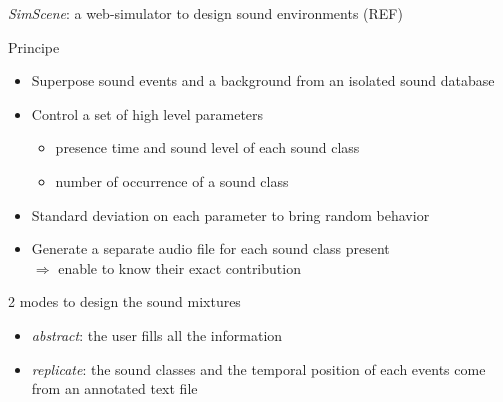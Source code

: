 \documentclass{beamer}
\begin{document}
\begin{frame}{\textit{SimScene}: a web-simulator to design sound environments (REF)}
\begin{block}{Principe}
\begin{itemize}
	\item Superpose sound events and a background from an isolated sound database
	\item Control a set of high level parameters
	\begin{itemize}
		\item presence time and sound level of each sound class
		\item number of occurrence of a sound class
	\end{itemize}
	\item Standard deviation on each parameter to bring random behavior
	\item Generate a separate audio file for each sound class present\\
	$\Rightarrow$ enable to know their exact contribution
	
\end{itemize}
\end{block}

\begin{block}{2 modes to design the sound mixtures}
\begin{itemize}
	\item \textit{abstract}: the user fills all the information 
	\item \textit{replicate}: the sound classes and the temporal position of each events come from an annotated text file
\end{itemize}
\end{block}

\end{frame}

\end{document}
